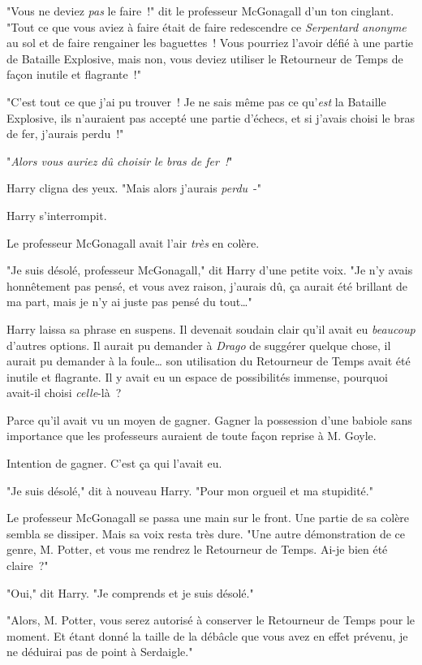 "Vous ne deviez \emph{pas} le faire~!" dit le professeur McGonagall d'un ton cinglant. "Tout ce que vous aviez à faire était de faire redescendre ce \emph{Serpentard anonyme} au sol et de faire rengainer les baguettes~! Vous pourriez l'avoir défié à une partie de Bataille Explosive, mais non, vous deviez utiliser le Retourneur de Temps de façon inutile et flagrante~!"

"C'est tout ce que j'ai pu trouver~! Je ne sais même pas ce qu'\emph{est} la Bataille Explosive, ils n'auraient pas accepté une partie d'échecs, et si j'avais choisi le bras de fer, j'aurais perdu~!"

"\emph{Alors vous auriez dû choisir le bras de fer~!}"

Harry cligna des yeux. "Mais alors j'aurais \emph{perdu}~-"

Harry s'interrompit.

Le professeur McGonagall avait l'air \emph{très} en colère.

"Je suis désolé, professeur McGonagall," dit Harry d'une petite voix. "Je n'y avais honnêtement pas pensé, et vous avez raison, j'aurais dû, ça aurait été brillant de ma part, mais je n'y ai juste pas pensé du tout…"

Harry laissa sa phrase en suspens. Il devenait soudain clair qu'il avait eu \emph{beaucoup} d'autres options. Il aurait pu demander à \emph{Drago} de suggérer quelque chose, il aurait pu demander à la foule… son utilisation du Retourneur de Temps avait été inutile et flagrante. Il y avait eu un espace de possibilités immense, pourquoi avait-il choisi \emph{celle}-là~?

Parce qu'il avait vu un moyen de gagner. Gagner la possession d'une babiole sans importance que les professeurs auraient de toute façon reprise à M. Goyle.

Intention de gagner. C'est ça qui l'avait eu.

"Je suis désolé," dit à nouveau Harry. "Pour mon orgueil et ma stupidité."

Le professeur McGonagall se passa une main sur le front. Une partie de sa colère sembla se dissiper. Mais sa voix resta très dure. "Une autre démonstration de ce genre, M. Potter, et vous me rendrez le Retourneur de Temps. Ai-je bien été claire~?"

"Oui," dit Harry. "Je comprends et je suis désolé."

"Alors, M. Potter, vous serez autorisé à conserver le Retourneur de Temps pour le moment. Et étant donné la taille de la débâcle que vous avez en effet prévenu, je ne déduirai pas de point à Serdaigle."


